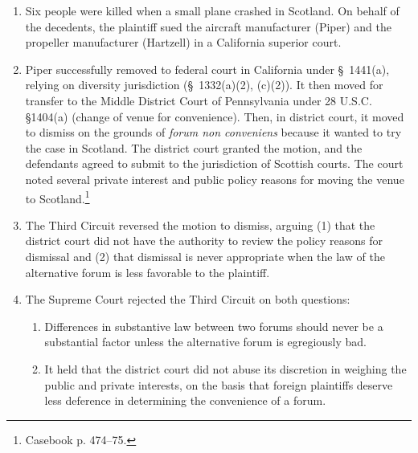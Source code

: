 \begin{enumerate}
    \item Six people were killed when a small plane crashed in Scotland. On 
    behalf of the decedents, the plaintiff sued the aircraft manufacturer 
    (Piper) and the propeller manufacturer (Hartzell) in a California superior 
    court.
    \item Piper successfully removed to federal court in California under \S\ 
    1441(a), relying on diversity jurisdiction (\S\ 1332(a)(2), (c)(2)). It 
    then moved for transfer to the Middle District Court of Pennsylvania under 
    28 U.S.C. §1404(a) (change of venue for convenience). Then, in district 
    court, it moved to dismiss on the grounds of \emph{forum non conveniens} 
    because it wanted to try the case in Scotland. The district court granted 
    the motion, and the defendants agreed to submit to the jurisdiction of 
    Scottish courts.  The court noted several private interest and public 
    policy reasons for moving the venue to Scotland.\footnote{Casebook p. 
    474--75.}
    \item The Third Circuit reversed the motion to dismiss, arguing (1) that 
    the district court did not have the authority to review the policy reasons 
    for dismissal and (2) that dismissal is never appropriate when the law of 
    the alternative forum is less favorable to the plaintiff.
    \item The Supreme Court rejected the Third Circuit on both questions:
    \begin{enumerate}
        \item Differences in substantive law between two forums should never 
        be a substantial factor unless the alternative forum is egregiously 
        bad.
        \item It held that the district court did not abuse its discretion in 
        weighing the public and private interests, on the basis that foreign 
        plaintiffs deserve less deference in determining the convenience of a 
        forum.
    \end{enumerate}
\end{enumerate}
